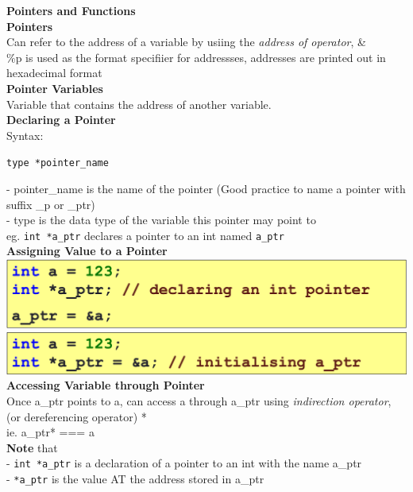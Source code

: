 \documentclass[10pt, a4paper]{article}
\newcommand{\highlight}[1]{{\color{red}\textbf{#1}}}
\begin{document}
\begin{multicols*}{3}
		{\normalsize\textbf{Pointers and Functions}}\\
		\textbf{Pointers}\\
		Can refer to the address of a variable by usiing the \textit{address of operator}, \&\\
		\%p is used as the format specifiier for addressses, addresses are printed out in hexadecimal format\\
		
		\textbf{Pointer Variables}\\
		Variable that contains the address of another variable.\\
		
		\textbf{Declaring a Pointer}\\
		Syntax:
		\begin{center}
			\texttt{type *pointer\_name}\\
		\end{center}
		- pointer\_name is the name of the pointer (Good practice to name a pointer with suffix \_p or \_ptr)\\
		- type is the data type of the variable this pointer may point to\\
		eg. \texttt{int *a\_ptr} declares a pointer to an int named \texttt{a\_ptr}\\
		
		\textbf{Assigning Value to a Pointer}\\
		\includegraphics[scale=0.25]{./assets/pointerDeclaration}\\
		\includegraphics[scale=0.25]{./assets/pointerDeclaration2}\\
		
		\textbf{Accessing Variable through Pointer}\\
		Once a\_ptr points to a, can access a through a\_ptr using \textit{indirection operator}, (or dereferencing operator) *\\
		ie. a\_ptr* === a\\
		
		\highlight{Note} that\\
		- \texttt{int *a\_ptr} is a declaration of a pointer to an int with the name a\_ptr\\
		- \texttt{*a\_ptr} is the value AT the address stored in a\_ptr\\
		

\end{multicols*}
\end{document}
